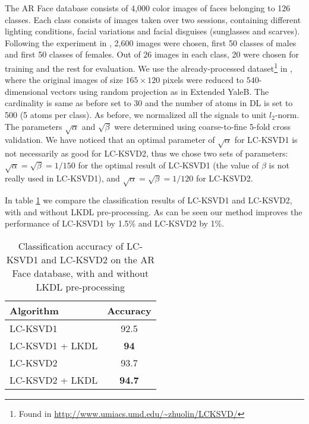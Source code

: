 \documentclass[journal]{IEEEtran}
\begin{document}
The AR Face database consists of 4,000 color images of faces belonging to 126 classes. Each class consists of images taken over two sessions, containing different lighting conditions, facial variations and facial disguises (sunglasses and scarves). Following the experiment in \cite{LCKSVD2}, 2,600 images were chosen, first 50 classes of males and first 50 classes of females. Out of 26 images in each class, 20 were chosen for training and the rest for evaluation. We use the already-processed dataset\footnote{Found in \url{http://www.umiacs.umd.edu/~zhuolin/LCKSVD/}} in \cite{LCKSVD2}, where the original images of size $165 \times 120$ pixels were reduced to $540$-dimensional vectors using random projection as in Extended YaleB. The cardinality is same as before set to 30 and the number of atoms in DL is set to 500 (5 atoms per class). As before, we normalized all the signals to unit $l_2$-norm. The parameters $\sqrt{\alpha}$ and $\sqrt{\beta}$ were determined using coarse-to-fine 5-fold cross validation. We have noticed that an optimal parameter of $\sqrt{\alpha}$ for LC-KSVD1 is not necessarily as good for LC-KSVD2, thus we chose two sets of parameters: $\sqrt{\alpha}=\sqrt{\beta}=1/150$ for the optimal result of LC-KSVD1 (the value of $\beta$ is not really used in LC-KSVD1), and $\sqrt{\alpha}=\sqrt{\beta}=1/120$ for LC-KSVD2.

In table \ref{table:LCKSVD AR_performance} we compare the classification results of LC-KSVD1 and LC-KSVD2, with and without LKDL pre-processing. As can be seen our method improves the performance of LC-KSVD1 by 1.5\% and LC-KSVD2 by 1\%.

\begin{table}[!t]
\caption{Classification accuracy of LC-KSVD1 and LC-KSVD2 on the AR Face database, with and without LKDL pre-processing}
\label{table:LCKSVD AR_performance}
\centering
\begin{tabular}{||l||c||}
\multicolumn{1}{l}{\bf Algorithm}  &\multicolumn{1}{c}{\bf Accuracy} \\
\hline
LC-KSVD1 & 92.5 \\
\hline
LC-KSVD1 + LKDL  & \textbf{94} \\
\hline
\hline
LC-KSVD2 & 93.7 \\
\hline
LC-KSVD2 + LKDL  & \textbf{94.7} \\
\hline
\end{tabular}
\end{table}
\end{document}
